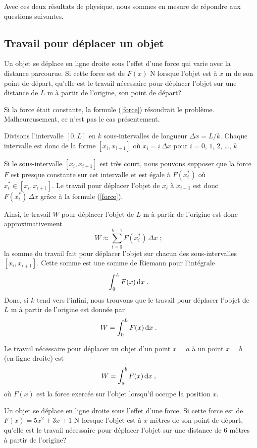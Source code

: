 {Avec ces deux résultats de physique, nous sommes en mesure de répondre aux
questions suivantes.

\subsection{Travail pour déplacer un objet}

Un objet se déplace en ligne droite sous l'effet d'une force qui varie
avec la distance parcourue.  Si cette force est de $F(x)$ N lorsque
l'objet est à $x$ m de son point de départ, qu'elle est le travail
nécessaire pour déplacer l'objet sur une distance de $L$ m à partir de
l'origine, son point de départ? 

Si la force était constante, la formule (\ref{force}) résoudrait le
problème.  Malheureusement, ce n'est pas le cas présentement.

Divisons l'intervalle $[0,L]$ en $k$ sous-intervalles de longueur
$\Delta x = L/k$.  Chaque intervalle est donc de la forme $[x_i,x_{i+1}]$ où
$x_i= i\,\Delta x$ pour $i=0$, $1$, $2$, \ldots, $k$.

Si le sous-intervalle $[x_i,x_{i+1}]$ est très court, nous pouvons supposer
que la force $F$ est presque constante sur cet intervalle et est égale
à $F(x_i^\ast)$ où $x_i^\ast \in [x_i,x_{i+1}]$.  Le travail pour
déplacer l'objet de $x_i$ à $x_{i+1}$ est donc $F(x_i^\ast)\,\Delta x$
grâce à la formule (\ref{force}).

Ainsi, le travail $W$ pour déplacer l'objet de $L$ m à partir de
l'origine est donc approximativement
\[
W \approx \sum_{i=0}^{k-1} F(x_i^\ast) \, \Delta x  \; ;
\]
la somme du travail fait pour déplacer l'objet sur chacun des
sous-intervalles $[x_i,x_{i+1}]$.  Cette somme est une somme de Riemann pour
l'intégrale
\[
\int_0^L F(x) \,\mathrm{d}x \; .
\]
Donc, si $k$ tend vers l'infini, nous trouvons que le travail pour déplacer
l'objet de $L$ m à partir de l'origine est donnée par
\[
W = \int_0^L F(x) \,\mathrm{d}x \; .
\]

\begin{meth} 
Le travail nécessaire pour déplacer un objet d'un point $x=a$ à un
point $x=b$ (en ligne droite) est
\[
W = \int_a^b F(x) \,\mathrm{d}x \; ,
\]
où $F(x)$ est la force exercée sur l'objet lorsqu'il occupe la
position $x$.
\end{meth}

\begin{egg}
Un objet se déplace en ligne droite sous l'effet d'une force.  Si cette force
est de $F(x) = 5x^2 +3x+1$ N lorsque l'objet est à $x$ mètres de son point de
départ, qu'elle est le travail nécessaire pour déplacer l'objet sur une
distance de $6$ mètres à partir de l'origine?


\end{egg}}
